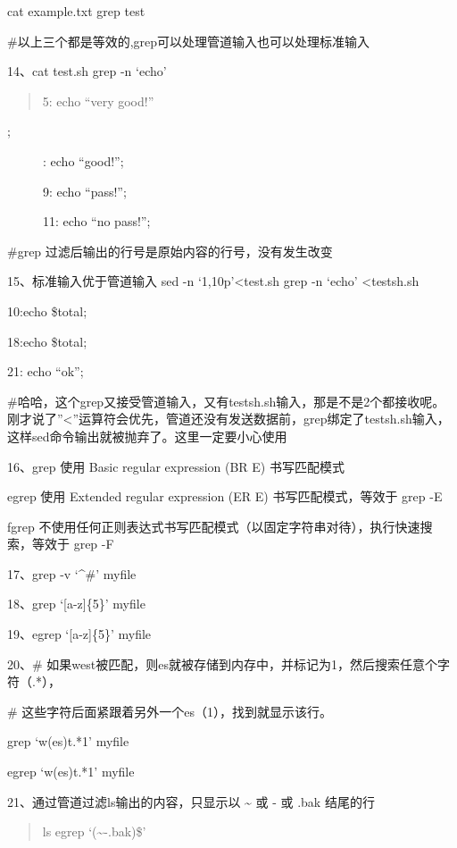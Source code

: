 \documentclass[letterpaper,10pt]{sphinxmanual}
\begin{document}
cat example.txt  \textbar{} grep test

\#以上三个都是等效的,grep可以处理管道输入也可以处理标准输入

14、cat test.sh \textbar{} grep -n `echo'
\begin{quote}

5:    echo ``very good!''
\end{quote}
\begin{description}
\item[{;}] :    echo ``good!'';

9:    echo ``pass!'';

11:    echo ``no pass!'';

\end{description}

\#grep 过滤后输出的行号是原始内容的行号，没有发生改变

15、标准输入优于管道输入
sed -n `1,10p'\textless{}test.sh \textbar{} grep -n `echo' \textless{}testsh.sh

10:echo \$total;

18:echo \$total;

21:     echo ``ok'';

\#哈哈，这个grep又接受管道输入，又有testsh.sh输入，那是不是2个都接收呢。刚才说了''\textless{}''运算符会优先，管道还没有发送数据前，grep绑定了testsh.sh输入，这样sed命令输出就被抛弃了。这里一定要小心使用

16、grep 使用 Basic regular expression (BR E) 书写匹配模式

egrep 使用 Extended regular expression (ER E) 书写匹配模式，等效于 grep -E

fgrep 不使用任何正则表达式书写匹配模式（以固定字符串对待），执行快速搜索，等效于 grep -F

17、grep -v `\textasciicircum{}\#' myfile

18、grep `{[}a-z{]}\{5\}' myfile

19、egrep `{[}a-z{]}\{5\}' myfile

20、\# 如果west被匹配，则es就被存储到内存中，并标记为1，然后搜索任意个字符（.*），

\# 这些字符后面紧跟着另外一个es（1），找到就显示该行。

grep `w(es)t.*1' myfile

egrep `w(es)t.*1' myfile

21、通过管道过滤ls输出的内容，只显示以 \textasciitilde{} 或 - 或 .bak 结尾的行
\begin{quote}

ls \textbar{} egrep `(\textasciitilde{}\textbar{}-{\color{red}\bfseries{}\textbar{}}.bak)\$'
\end{quote}
\end{document}
